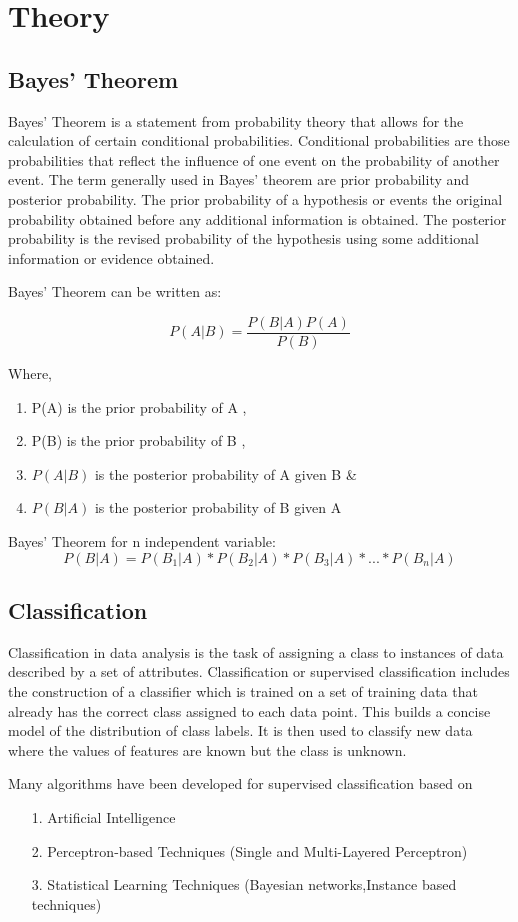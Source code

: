 \chapter{Theory}
\section{Bayes' Theorem}
\par
Bayes’ Theorem is a statement from probability theory that allows for the calculation of  certain conditional  probabilities. Conditional  probabilities  are  those  probabilities  that reflect  the influence  of  one  event  on  the  probability  of  another  event. The  term  generally used in Bayes’ theorem are prior probability and posterior probability. The prior probability of a hypothesis or events the original probability obtained before any additional information is obtained. The posterior probability is the revised probability of the hypothesis using some additional information or evidence obtained.\cite{garg2013design}
\par Bayes’ Theorem can be written as:

\[P(A|B)=\frac{P(B|A)P(A)}{P(B)}\]

Where,
\begin{enumerate}
\item P(A) is the prior probability of A , 
\item P(B) is the prior probability of B ,
\item $P(A | B)$ is the posterior probability of A given B \&
\item $P(B | A)$ is the posterior probability of B given A
\end{enumerate}

\par 
Bayes' Theorem for n independent variable:
\textbf{\[P(B|A)=P(B_1|A)*P(B_2|A)*P(B_3|A)*...*P(B_n|A)\]}

\section{Classification}
\par
Classification in data analysis is the task of assigning a class to instances of data described by a set of attributes. Classification or supervised classification includes the construction of a classifier which is trained on a set of training data
that already has the correct class assigned to each data point. This builds a concise model of the distribution of 
class labels. It is then used to classify new data where the values of features are known but the class is unknown.
\par
Many algorithms have been developed for supervised classification based on
\begin{itemize}
	\item[1.] Artificial Intelligence
	\item[2.] Perceptron-based Techniques (Single and Multi-Layered Perceptron)
	\item[3.] Statistical Learning Techniques (Bayesian networks,Instance based techniques)
\end{itemize}


